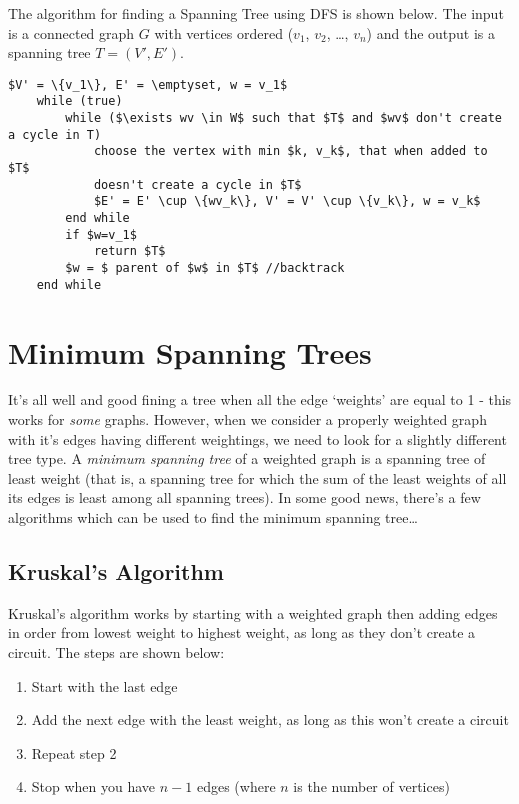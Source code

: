 The algorithm for finding a Spanning Tree using DFS is shown below. The input is a connected graph $G$ with vertices ordered ($v_1$, $v_2$, \ldots, $v_n$) and the output is a spanning tree $T = (V', E')$.

\begin{lstlisting}[style=haskellTrace]
    $V' = \{v_1\}, E' = \emptyset, w = v_1$
    while (true)
        while ($\exists wv \in W$ such that $T$ and $wv$ don't create a cycle in T)
            choose the vertex with min $k, v_k$, that when added to $T$
            doesn't create a cycle in $T$
            $E' = E' \cup \{wv_k\}, V' = V' \cup \{v_k\}, w = v_k$
        end while
        if $w=v_1$
            return $T$
        $w = $ parent of $w$ in $T$ //backtrack
    end while
\end{lstlisting}

\section{Minimum Spanning Trees}
It's all well and good fining a tree when all the edge `weights' are equal to 1 - this works for \textit{some} graphs. However, when we consider a properly weighted graph with it's edges having different weightings, we need to look for a slightly different tree type. A \textit{minimum spanning tree} of a weighted graph is a spanning tree of least weight (that is, a spanning tree for which the sum of the least weights of all its edges is least among all spanning trees). In some good news, there's a few algorithms which can be used to find the minimum spanning tree\ldots

\subsection{Kruskal's Algorithm}
Kruskal's algorithm works by starting with a weighted graph then adding edges in order from lowest weight to highest weight, as long as they don't create a circuit. The steps are shown below:
\begin{enumerate}
    \item Start with the last edge
    \item Add the next edge with the least weight, as long as this won't create a circuit
    \item Repeat step 2
    \item Stop when you have $n-1$ edges (where $n$ is the number of vertices)
\end{enumerate}

